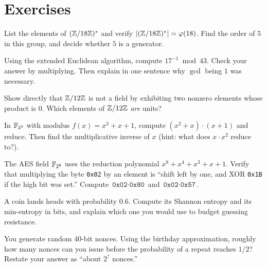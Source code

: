 \section{Exercises}
\label{ch41:exercises}

\begin{exercise}
List the elements of $(\mathbb{Z}/18\mathbb{Z})^{*}$ and verify $\lvert(\mathbb{Z}/18\mathbb{Z})^{*}\rvert=\varphi(18)$. Find the
order of $5$ in this group, and decide whether $5$ is a generator.
\end{exercise}

\begin{exercise}
Using the extended Euclidean algorithm, compute $17^{-1} \bmod 43$. Check your
answer by multiplying. Then explain in one sentence why $\gcd$ being $1$ was
necessary.
\end{exercise}

\begin{exercise}
Show directly that $\mathbb{Z}/12\mathbb{Z}$ is not a field by exhibiting two nonzero elements
whose product is $0$. Which elements of $\mathbb{Z}/12\mathbb{Z}$ \emph{are} units?
\end{exercise}

\begin{exercise}
In $\mathbb{F}_{2^3}$ with modulus $f(x)=x^3+x+1$, compute $(x^2+x)\cdot(x+1)$ and reduce.
Then find the multiplicative inverse of $x$ (hint: what does $x\cdot x^2$ reduce
to?).
\end{exercise}

\begin{exercise}
The AES field $\mathbb{F}_{2^8}$ uses the reduction polynomial $x^8+x^4+x^3+x+1$. Verify
that multiplying the byte \texttt{0x02} by an element is ``shift left by one, and
XOR \texttt{0x1B} if the high bit was set.'' Compute $\texttt{0x02} \cdot
\texttt{0x80}$ and $\texttt{0x02}\cdot\texttt{0x57}$.
\end{exercise}

\begin{exercise}
A coin lands heads with probability $0.6$. Compute its Shannon entropy and its
min-entropy in bits, and explain which one you would use to budget guessing
resistance.
\end{exercise}

\begin{exercise}
You generate random $40$-bit nonces. Using the birthday approximation, roughly how
many nonces can you issue before the probability of a repeat reaches $1/2$? Restate
your answer as ``about $2^{?}$ nonces.''
\end{exercise}

